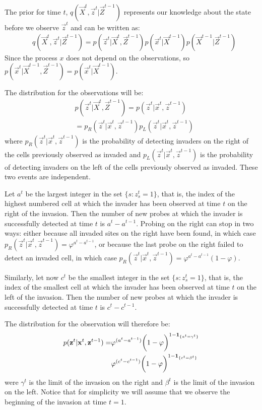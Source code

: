 The prior for time $t$, $q(\vec{X}^{t}, \vec{z}^t | \vec{Z}^{t-1})$ represents our knowledge about the state before we observe $\vec{z}^{t}$ and can be written as:
\begin{align}
    & q(\vec{X}^{t}, \vec{z}^{t} | \vec{Z}^{t-1}) = p(\vec{z}^{t} | \vec{X}^{t}, \vec{Z}^{t-1}) p(\vec{x}^{t} | \vec{X}^{t-1}) p(\vec{X}^{t-1} | \vec{Z}^{t-1}) \label{eq:3}
\end{align}
Since the process $x$ does not depend on the observations, so $p(\vec{x}^{t} | \vec{X}^{t-1}, \vec{Z}^{t-1}) = p(\vec{x}^{t} | \vec{X}^{t-1})$.

The distribution for the observations will be:
\begin{align*}
    & p(\vec{z}^{t} | \vec{X}^{t}, \vec{Z}^{t-1}) = p(\vec{z}^{t} | \vec{x}^{t}, \vec{z}^{t-1}) \\
    & = p_R(\vec{z}^{t} | \vec{x}^{t}, \vec{z}^{t-1}) p_L(\vec{z}^{t} | \vec{x}^{t}, \vec{z}^{t-1})
\end{align*}
where $p_R(\vec{z}^{t} | \vec{x}^{t}, \vec{z}^{t-1})$ is the probability of detecting invaders on the right of the cells previously observed as invaded and $p_L(\vec{z}^{t} | \vec{x}^{t}, \vec{z}^{t-1})$ is the probability of detecting invaders on the left of the cells previously observed as invaded. These two events are independent.

Let $a^{t}$ be the largest integer in the set $\{ s : z_s^{t} = 1 \}$, that is, the index of the highest numbered cell at which the invader has been observed at time $t$ on the right of the invasion. Then the number of new probes at which the invader is successfully detected at time $t$ is $a^{t} - a^{t-1}$. Probing on the right can stop in two ways: either because all invaded sites on the right have been found, in which case $p_R(\vec{z}^{t} | \vec{x}^{t}, \vec{z}^{t-1}) = \varphi^{a^{t} - a^{t-1}}$, or because the last probe on the right failed to detect an invaded cell, in which case $p_R(\vec{z}^{t} | \vec{x}^{t}, \vec{z}^{t-1}) = \varphi^{a^{t} - a^{t-1}} (1 - \varphi)$.

Similarly, let now $c^{t}$ be the smallest integer in the set $\{ s : z_s^{t} = 1 \}$, that is, the index of the smallest cell at which the invader has been observed at time $t$ on the left of the invasion. Then the number of new probes at which the invader is successfully detected at time $t$ is $c^{t} - c^{t-1}$.

The distribution for the observation will therefore be:
\begin{align*}
    p(\mathbf{z}^{t} | \mathbf{x}^{t}, \mathbf{z}^{t-1}) = &\varphi^{(a^{t} - a^{t-1})} \bigg(1 - \varphi \bigg)^{1-\mathbf{1}_{\{a^{t}=\gamma^{t}\}}}\\
    &\varphi^{(c^{t} - c^{t-1})} \bigg( 1 - \varphi \bigg)^{1-\mathbf{1}_{\{c^{t}=\beta^{t}\}}}
\end{align*}
were $\gamma^{t}$ is the limit of the invasion on the right and $\beta^{t}$ is the limit of the invasion on the left. Notice that for simplicity we will assume that we observe the beginning of the invasion at time $t=1$. 

